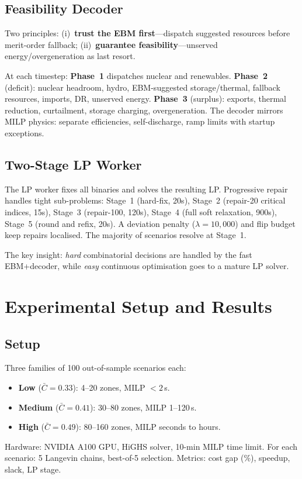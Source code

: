 \documentclass{article}
\begin{document}
\subsection{Feasibility Decoder}

Two principles: (i)~\textbf{trust the EBM first}---dispatch suggested resources before merit-order fallback; (ii)~\textbf{guarantee feasibility}---unserved energy/overgeneration as last resort.

At each timestep: \textbf{Phase~1} dispatches nuclear and renewables. \textbf{Phase~2} (deficit): nuclear headroom, hydro, EBM-suggested storage/thermal, fallback resources, imports, DR, unserved energy. \textbf{Phase~3} (surplus): exports, thermal reduction, curtailment, storage charging, overgeneration. The decoder mirrors MILP physics: separate efficiencies, self-discharge, ramp limits with startup exceptions.

\subsection{Two-Stage LP Worker}

The LP worker fixes all binaries and solves the resulting LP. Progressive repair handles tight sub-problems: Stage~1 (hard-fix, 20s), Stage~2 (repair-20 critical indices, 15s), Stage~3 (repair-100, 120s), Stage~4 (full soft relaxation, 900s), Stage~5 (round and refix, 20s). A deviation penalty ($\lambda = 10{,}000$) and flip budget keep repairs localised. The majority of scenarios resolve at Stage~1.

The key insight: \emph{hard} combinatorial decisions are handled by the fast EBM+decoder, while \emph{easy} continuous optimisation goes to a mature LP solver.


\section{Experimental Setup and Results}
\label{sec:experiments}

\subsection{Setup}

Three families of 100 out-of-sample scenarios each:
\begin{itemize}[noitemsep]
  \item \textbf{Low} ($\bar{C} = 0.33$): 4--20 zones, MILP $<2$\,s.
  \item \textbf{Medium} ($\bar{C} = 0.41$): 30--80 zones, MILP 1--120\,s.
  \item \textbf{High} ($\bar{C} = 0.49$): 80--160 zones, MILP seconds to hours.
\end{itemize}
Hardware: NVIDIA A100 GPU, HiGHS solver, 10-min MILP time limit. For each scenario: 5 Langevin chains, best-of-5 selection. Metrics: cost gap (\%), speedup, slack, LP stage.
\end{document}
